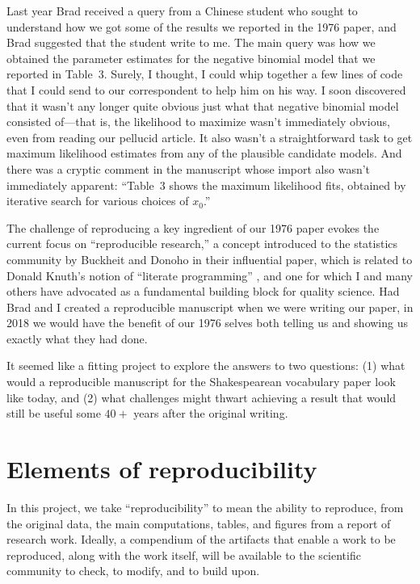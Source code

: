 \documentclass[
  letterpaper, %
  11pt, %
  oneside,  %
  onecolumn,  %
  openany,  %
  article
]{memoir}
\begin{document}
	Last year Brad received a query from a Chinese student who sought to understand how we got some of the results we reported in the 1976 paper, and Brad suggested that the student write to me.  The main query was how we obtained the parameter estimates for the negative binomial model that we reported in Table~3.  Surely, I thought, I could whip together a few lines of code that I could send to our correspondent to help him on his way.  I soon discovered that it wasn't any longer quite obvious just what that negative binomial model consisted of---that is, the likelihood to maximize wasn't immediately obvious, even from reading our pellucid article.  It also wasn't a straightforward task to get maximum likelihood estimates from any of the plausible candidate models.  And there was a cryptic comment in the manuscript whose import also wasn't immediately apparent: ``Table~3 shows the maximum likelihood fits, obtained by iterative search for various choices of $x_0$.''
	
	The challenge of reproducing a key ingredient of our 1976 paper evokes the current focus on ``reproducible research,'' a concept introduced to the statistics community by Buckheit and Donoho in their influential \citeyear{Buckheit:1995hl} paper, which is related to Donald Knuth's notion of ``literate programming'' \citep{knuth1984literate}, and one for which I and many others have advocated as a fundamental building block for quality science.  Had Brad and I created a reproducible manuscript when we were writing our paper, in 2018 we would have the benefit of our 1976 selves both telling us and showing us exactly what they had done.
	
	It seemed like a fitting project to explore the answers to two questions: (1) what would a reproducible manuscript for the Shakespearean vocabulary paper look like today, and (2) what challenges might thwart achieving a result that would still be useful some $40+$ years after the original writing.
	
\chapter[Elements of reproducibility]{Elements of reproducibility}

	In this project, we take ``reproducibility'' to mean the ability to reproduce, from the original data, the main computations, tables, and figures from a report of research work.  Ideally, a compendium of the artifacts that enable a work to be reproduced, along with the work itself, will be available to the scientific community to check, to modify, and to build upon.
	
\end{document}
